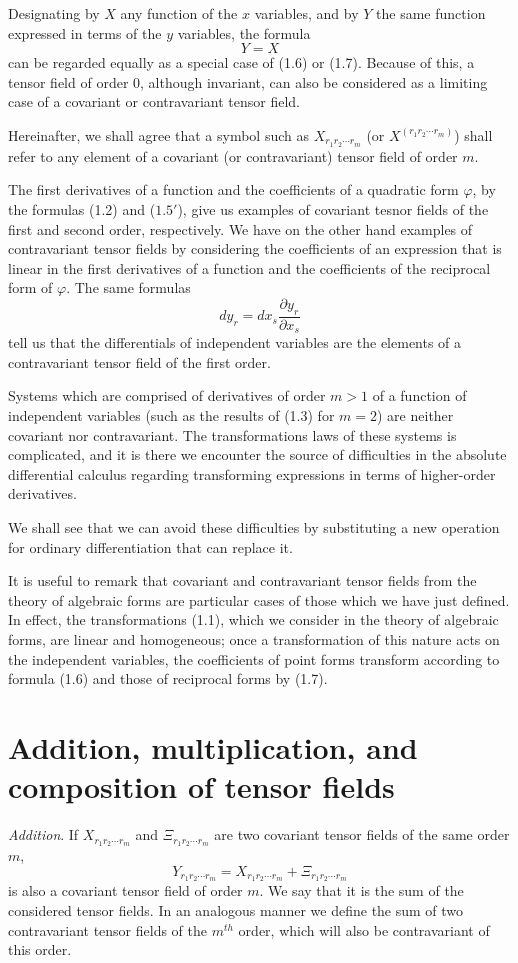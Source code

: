 \documentclass{book}
\begin{document}
Designating by $X$ any function of the $x$ variables, and by $Y$ the same function expressed in terms of the $y$ variables, the formula
$$Y=X$$
can be regarded equally as a special case of (1.6) or (1.7). Because of this, a tensor field of order 0, although invariant, can also be considered as a limiting case of a covariant or contravariant tensor field.

Hereinafter, we shall agree that a symbol such as $X_{r_1r_2\cdots r_m}$ (or $X^{(r_1r_2\cdots r_m)}$) shall refer to any element of a covariant (or contravariant) tensor field of order $m$.

The first derivatives of a function and the coefficients of a quadratic form $\varphi$, by the formulas (1.2) and ($1.5'$), give us examples of covariant tesnor fields of the first and second order, respectively. We have on the other hand examples of contravariant tensor fields by considering the coefficients of an expression that is linear in the first derivatives of a function and the coefficients of the reciprocal form of $\varphi$. The same formulas
$$dy_r=dx_s\frac{\partial y_r}{\partial x_s}$$
tell us that the differentials of independent variables are the elements of a contravariant tensor field of the first order.

Systems which are comprised of derivatives of order $m>1$ of a function of independent variables (such as the results of (1.3) for $m=2$) are neither covariant nor contravariant. The transformations laws of these systems is complicated, and it is there we encounter the source of difficulties in the absolute differential calculus regarding transforming expressions in terms of higher-order derivatives.

We shall see that we can avoid these difficulties by substituting a new operation for ordinary differentiation that can replace it.

It is useful to remark that covariant and contravariant tensor fields from the theory of algebraic forms are particular cases of those which we have just defined. In effect, the transformations (1.1), which we consider in the theory of algebraic forms, are linear and homogeneous; once a transformation of this nature acts on the independent variables, the coefficients of point forms transform according to formula (1.6) and those of reciprocal forms by (1.7).
\section{Addition, multiplication, and composition of tensor fields}
\emph{Addition}. If $X_{r_1r_2\cdots r_m}$ and $\Xi_{r_1r_2\cdots r_m}$ are two covariant tensor fields of the same order $m$,
$$Y_{r_1r_2\cdots r_m}=X_{r_1r_2\cdots r_m} + \Xi_{r_1r_2\cdots r_m}$$
is also a covariant tensor field of order $m$. We say that it is the sum of the considered tensor fields. In an analogous manner we define the sum of two contravariant tensor fields of the $m^{th}$ order, which will also be contravariant of this order.
\end{document}
